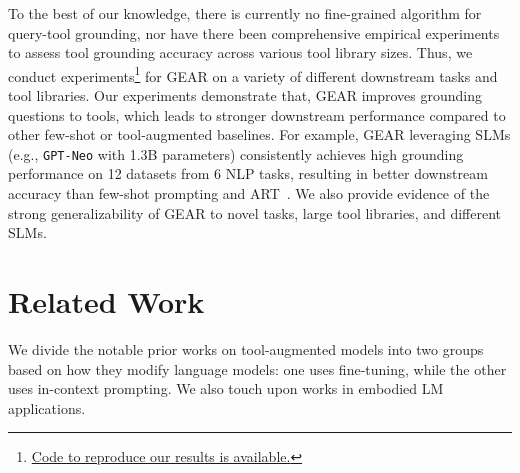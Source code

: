 \documentclass[11pt]{article}
\newcommand{\llm}{\textcolor{darkredTwo}{LLM}}
\newcommand{\slm}{\textcolor{darkblueTwo}{SLM}}
\newcommand{\name}{{\fontfamily{cmss}\selectfont GEAR}}
\newcommand{\gptj}{{\tt \textcolor{darkredTwo}{GPT-J}}}
\newcommand{\gptDavinciThree}{{\tt \textcolor{darkredTwo}{GPT3$_{\text{davinci-003}}$}}}
\newcommand{\gptNeo}{{\tt \textcolor{darkblueTwo}{GPT-Neo}}}
\newcommand{\gptTwoLarge}{{\tt \textcolor{darkblueTwo}{GPT2$_{\text{large}}$}}}
\newcommand{\gptTwo}{{\tt \textcolor{darkblueTwo}{GPT2$_{\text{medium}}$}}}
\newcommand{\miniLM}{{\tt \textcolor{darkblueTwo}{MiniLM}}}
\newcommand{\gptThree}{{\tt \textcolor{darkredTwo}{GPT-3}}}
\newcommand{\mpnet}{{\tt \textcolor{darkblueTwo}{MPNet}}}
\begin{document}
To the best of our knowledge, there is currently no fine-grained algorithm for query-tool grounding, nor have there been comprehensive empirical experiments to assess tool grounding accuracy across various tool library sizes. Thus, we conduct experiments\footnote{
\href{https://github.com/yining610/GEAR}{Code to reproduce our results is available.}} for \name{} on a variety of different downstream tasks and tool libraries. Our experiments demonstrate that, \name{} improves grounding questions to tools, which leads to stronger downstream performance compared to other few-shot or tool-augmented baselines. 
For example, \name{} leveraging \slm s (e.g., \gptNeo{} with 1.3B parameters) consistently achieves high grounding performance on 12 datasets from 6 NLP tasks, resulting in better downstream accuracy than few-shot prompting and ART~\citep{paranjape2023art}. We also provide evidence of the strong generalizability of \name{} to novel tasks, large tool libraries, and different \slm s.

\section{Related Work}
We divide the notable prior works on tool-augmented models into two groups based on how they modify language models: one uses fine-tuning, while the other uses in-context prompting. We also touch upon works in embodied LM applications.
\end{document}
